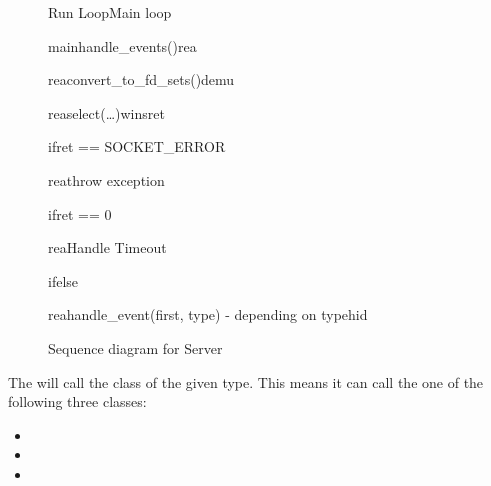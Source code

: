 \documentclass[Main]{subfiles}
\begin{document}
\begin{figure}
\begin {sequencediagram}

	\begin{sdblock}{Run Loop}{Main loop}
		\begin{messcall}{main}{handle\_events()}{rea}
			\begin{messcall}{rea}{convert\_to\_fd\_sets()}{demu}
			\end{messcall}

			\begin{call}{rea}{select(\dots)}{wins}{ret}
			\end{call}

			\begin{sdblock}{if}{ret == SOCKET\_ERROR}
				\begin{callself}{rea}{throw exception}{}
				\end{callself}
			\end{sdblock}

			\begin{sdblock}{if}{ret == 0}
				\begin{callself}{rea}{Handle Timeout}{}
				\end{callself}
			\end{sdblock}

			\begin{sdblock}{if}{else}
				\begin{messcall}{rea}{handle\_event(first, type) - depending on type}{hid}
				\end{messcall}
			\end{sdblock}

		\end{messcall}
	\end{sdblock}

\end{sequencediagram}

\caption{Sequence diagram for Server}
\label{seq:serverMain}
\end{figure}

The  will call the class of the given type.
This means it can call the one of the following three classes:
\begin{itemize}
	\item {}
	\item {}
	\item {}
\end{itemize}
\end{document}
